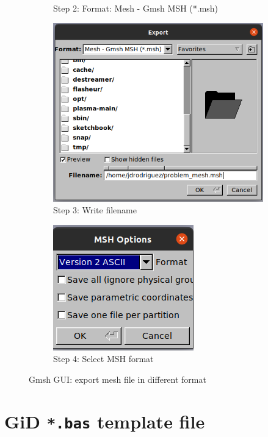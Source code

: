 \documentclass[a4paper,fleqn]{book}
\begin{document}
\begin{figure}
\begin{subfigure}[b]{0.6\textwidth}
        \caption{Step 2: Format: Mesh - Gmsh MSH (*.msh)}
    \end{subfigure}
    \vfill
    \begin{subfigure}[b]{0.6\textwidth}
        \centering
        \includegraphics[scale=0.5]{figures/gmsh_export_3.png}
        \caption{Step 3: Write filename}
    \end{subfigure}
    \hfill
    \begin{subfigure}[b]{0.39\textwidth}
        \centering
        \includegraphics[scale=0.5]{figures/gmsh_export_4.png}
        \caption{Step 4: Select MSH format}
    \end{subfigure}   
    \caption{Gmsh GUI: export mesh file in different format}
    \label{fig:gmsh_export}
\end{figure}

\chapter{GiD \texttt{*.bas} template file}
\end{document}
